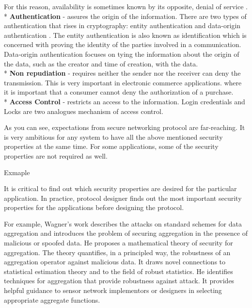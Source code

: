 	For this reason, availability is sometimes known by its opposite, denial of service \cite{pfleeger2002security}.
	\\*
	\textbf{Authentication} - assures the origin of the information.
	There are two types of authentication that rises in cryptography: entity authentication and data-origin authentication \cite{trappe2006introduction}.
	The entity authentication is also known as identification which is concerned with proving the identity of the parties involved in a communication.
	Data-origin authentication focuses on tying the information about the origin of the data, such as the creator and time of creation, with the data.\\*
	\textbf{Non repudiation} - requires neither the sender nor the receiver can deny the transmission.
	This is very important in electronic commerce applications. where it is important that a consumer cannot deny the authorization of a purchase.
	\\*
	\textbf{Access Control} - restricts an access to the information.
	Login credentials and Locks are two analogues mechanism of access control.

	As you can see, expectations from secure networking protocol are far-reaching.
	It is very ambitious for any system to have all the above mentioned security properties at the same time.
	For some applications, some of the security properties are not required as well.
	

	
	Exmaple
	
	It is critical to find out which security properties are desired for the particular application.
	In practice, protocol designer finds out the most important security properties for the applications before designing the protocol.

	For example, Wagner's work \cite{wagner2004resilient} describes the attacks on standard schemes for data aggregation and introduces the problem of securing aggregation in the presence of malicious or spoofed data.
	He proposes a mathematical theory of security for aggregation.
	The theory quantifies, in a principled way, the robustness of an aggregation operator against malicious data.
	It draws novel connections to statistical estimation theory and to the field of robust statistics.
	He identifies techniques for aggregation that provide robustness against attack. 
	It provides helpful guidance to sensor network implementors or designers in selecting appropriate aggregate functions.

